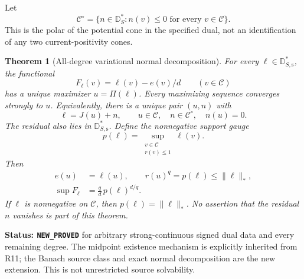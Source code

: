 \documentclass[11pt,a4paper]{article}
\numberwithin{equation}{section}
\newtheorem{theorem}{Theorem}[section]
\theoremstyle{definition}
\theoremstyle{remark}
\begin{document}
Let
\[
 \mathscr C^\circ
   =\{n\in\mathbb D_S^*:n(v)\leq0\text{ for every }v\in\mathscr C\}.
 \tag{NI5}
\]
This is the polar of the potential cone in the specified dual,
not an identification of any two current-positivity cones.

\begin{theorem}[All-degree variational normal decomposition]
\label{thm:r12-nonlinear-normal-decomposition}
For every $\ell\in\mathbb D_{S,\mathrm{s}}^*$, the functional
\[
                F_\ell(v)=\ell(v)-e(v)/d\qquad(v\in\mathscr C)
 \tag{NI6}
\]
has a unique maximizer $u=\Pi(\ell)$. Every maximizing sequence
converges strongly to $u$. Equivalently, there is a unique pair
$(u,n)$ with
\[
       \ell=J(u)+n,\qquad
       u\in\mathscr C,\quad n\in\mathscr C^\circ,
                           \quad n(u)=0.
 \tag{NI7}
\]
The residual also lies in $\mathbb D_{S,\mathrm{s}}^*$.
Define the nonnegative support gauge
\[
       p(\ell)=\sup_{\substack{v\in\mathscr C\\r(v)\leq1}}\ell(v).
 \tag{NI8}
\]
Then
\[
 \begin{split}
 e(u)&=\ell(u),\qquad r(u)^q=p(\ell)\leq\|\ell\|_*,\\
 \sup F_\ell&=\frac qd\,p(\ell)^{d/q}.
 \end{split}
 \tag{NI9}
\]
If $\ell$ is nonnegative on $\mathscr C$, then
$p(\ell)=\|\ell\|_*$. No assertion that the residual $n$ vanishes
is part of this theorem.
\end{theorem}

\noindent\textbf{Status: \texttt{NEW\_PROVED}} for arbitrary
strong-continuous signed dual data and every remaining degree.
The midpoint existence mechanism is explicitly inherited from
R11; the Banach source class and exact normal decomposition
are the new extension. This is not unrestricted source solvability.
\end{document}
